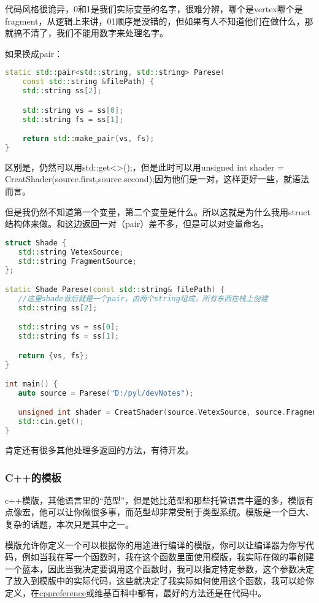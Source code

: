 代码风格很诡异，0和1是我们实际变量的名字，很难分辨，哪个是vertex哪个是fragment，从逻辑上来讲，01顺序是没错的，但如果有人不知道他们在做什么，那就搞不清了，我们不能用数字来处理名字。

如果换成pair：

\begin{lstlisting}[language=c++]
static std::pair<std::string, std::string> Parese(
    const std::string &filePath) {
    std::string ss[2];

    std::string vs = ss[0];
    std::string fs = ss[1];

    return std::make_pair(vs, fs);
}
\end{lstlisting}

区别是，仍然可以用{\ncodestyle std::get<>();}，但是此时可以用{\ncodestyle unsigned int shader = CreatShader(source.first,source.second);}因为他们是一对，这样更好一些，就语法而言。

但是我仍然不知道第一个变量，第二个变量是什么。所以这就是为什么我用{\ncodestyle struct}结构体来做。和这边返回一对（pair）差不多，但是可以对变量命名。


\begin{lstlisting}[language=c++]
struct Shade {
   std::string VetexSource;
   std::string FragmentSource;
};

static Shade Parese(const std::string& filePath) {
   //这里shade背后就是一个pair，由两个string组成，所有东西在栈上创建
   std::string ss[2];

   std::string vs = ss[0];
   std::string fs = ss[1];

   return {vs, fs};
}

int main() {
   auto source = Parese("D:/pyl/devNotes");

   unsigned int shader = CreatShader(source.VetexSource, source.FragmentSource);
   std::cin.get();
}
\end{lstlisting}

肯定还有很多其他处理多返回的方法，有待开发。

\subsubsection{C++的模板}

c++模版，其他语言里的“范型”，但是她比范型和那些托管语言牛逼的多，模版有点像宏，他可以让你做很多事，而范型却非常受制于类型系统。模版是一个巨大、复杂的话题，本次只是其中之一。

模版允许你定义一个可以根据你的用途进行编译的模版，你可以让编译器为你写代码，例如当我在写一个函数时，我在这个函数里面使用模版，我实际在做的事创建一个蓝本，因此当我决定要调用这个函数时，我可以指定特定参数，这个参数决定了放入到模版中的实际代码，这些就决定了我实际如何使用这个函数，我可以给你定义，在\href{https://zh.cppreference.com/w/首页}{cppreference}或维基百科中都有，最好的方法还是在代码中。

